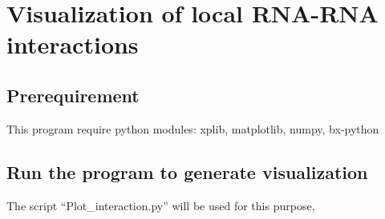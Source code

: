 \documentclass[letterpaper,10pt,english]{sphinxmanual}
\begin{document}
\chapter{Visualization of local RNA-RNA interactions}
\label{Visualization::doc}\label{Visualization:visualization-of-local-rna-rna-interactions}\label{Visualization:visualizationlocal}

\section{Prerequirement}
\label{Visualization:prerequirement}
This program require python modules: xplib, matplotlib, numpy, bx-python


\section{Run the program to generate visualization}
\label{Visualization:plotinteraction}\label{Visualization:run-the-program-to-generate-visualization}
The script ``Plot\_interaction.py'' will be used for this purpose,
\end{document}
